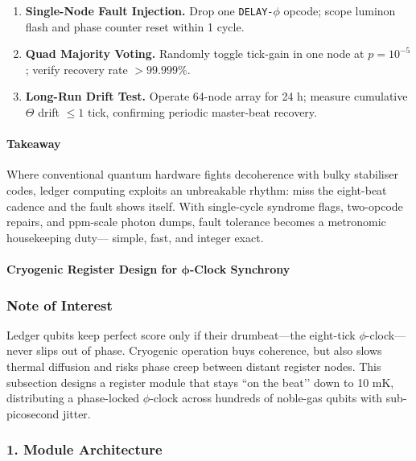 \documentclass[11pt,oneside]{book}
\begin{document}
\begin{enumerate}[label=\textbf{\arabic*.},leftmargin=1.2cm]
\item \textbf{Single-Node Fault Injection.}  
      Drop one \texttt{DELAY-\(\phi\)} opcode; scope luminon flash and
      phase counter reset within 1 cycle.
\item \textbf{Quad Majority Voting.}  
      Randomly toggle tick-gain in one node at \(p=10^{-5}\); verify
      recovery rate \(>99.999\%\).
\item \textbf{Long-Run Drift Test.}  
      Operate 64-node array for 24 h; measure cumulative \(\Theta\) drift
      \(\le1\) tick, confirming periodic master-beat recovery.
\end{enumerate}

\paragraph*{Takeaway}

Where conventional quantum hardware fights decoherence with bulky
stabiliser codes, ledger computing exploits an unbreakable rhythm:
miss the eight-beat cadence and the fault shows itself.
With single-cycle syndrome flags, two-opcode repairs, and ppm-scale
photon dumps, fault tolerance becomes a metronomic housekeeping duty—
simple, fast, and integer exact.

\bigskip

\paragraph{Cryogenic Register Design for \texorpdfstring{$\boldsymbol{\phi}$}{φ}-Clock Synchrony}
\label{sec:cryo-register}

\subsubsection*{Note of Interest}

Ledger qubits keep perfect score only if their drumbeat—the
eight-tick $\phi$-clock—never slips out of phase.  
Cryogenic operation buys coherence, but also slows thermal diffusion and
risks phase creep between distant register nodes.  
This subsection designs a register module that stays “on the beat’’ down
to 10 mK, distributing a phase-locked $\phi$-clock across hundreds of
noble-gas qubits with sub-picosecond jitter.

\subsubsection*{1. Module Architecture}
\end{document}
